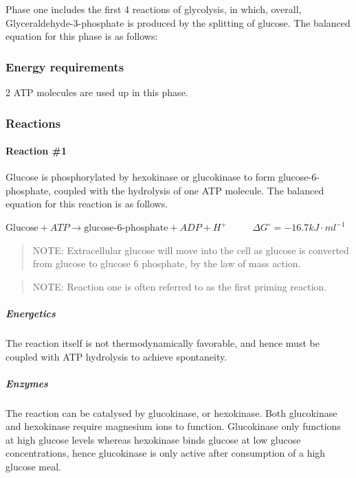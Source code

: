 \documentclass[]{article}
\let\oldparagraph\paragraph
\renewcommand{\paragraph}[1]{\oldparagraph{#1}\mbox{}}
\let\oldsubparagraph\subparagraph
\renewcommand{\subparagraph}[1]{\oldsubparagraph{#1}\mbox{}}
\begin{document}
Phase one includes the first 4 reactions of glycolysis, in which,
overall, Glyceraldehyde-3-phosphate is produced by the splitting of
glucose. The balanced equation for this phase is as follows: \newline 

\hypertarget{energy-requirements}{%
\subsubsection{Energy requirements}\label{energy-requirements}}

2 ATP molecules are used up in this phase.

\hypertarget{reactions}{%
\subsubsection{Reactions}\label{reactions}}

\hypertarget{reaction-1}{%
\paragraph{Reaction \#1}\label{reaction-1}}

Glucose is phosphorylated by hexokinase or glucokinase to form
glucose-6-phosphate, coupled with the hydrolysis of one ATP molecule.
The balanced equation for this reaction is as follows.

\(\text{Glucose} + ATP \rightarrow \text{glucose-6-phosphate} + ADP + H^+\)
\(\quad \quad\) \(\Delta G^\circ = -16.7 kJ\cdot ml^{-1}\)

\begin{quote}
NOTE: Extracellular glucose will move into the cell as glucose is
converted from glucose to glucose 6 phosphate, by the law of mass
action.
\end{quote}

\begin{quote}
NOTE: Reaction one is often referred to as the first priming reaction.
\end{quote}

\hypertarget{energetics}{%
\subparagraph{Energetics}\label{energetics}}

The reaction itself is not thermodynamically favorable, and hence must
be coupled with ATP hydrolysis to achieve spontaneity.

\hypertarget{enzymes}{%
\subparagraph{Enzymes}\label{enzymes}}

The reaction can be catalysed by glucokinase, or hexokinase. Both
glucokinase and hexokinase require magnesium ions to function.
Glucokinase only functions at high glucose levels whereas hexokinase
binds glucose at low glucose concentrations, hence glucokinase is only
active after consumption of a high glucose meal.
\end{document}
